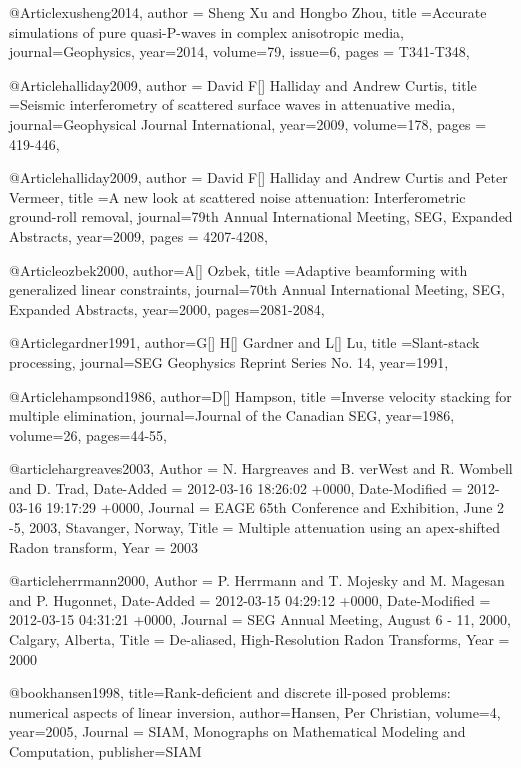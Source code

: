 @Article{xusheng2014,
  author = {Sheng Xu and Hongbo Zhou},
  title ={Accurate simulations of pure quasi-P-waves in complex anisotropic media},
  journal={Geophysics},
  year=2014,
  volume={79},
  issue=6,
  pages = {T341-T348},
}

@Article{halliday2009,
  author = {David F[] Halliday and Andrew Curtis},
  title ={Seismic interferometry of scattered surface waves in attenuative media},
  journal={Geophysical Journal International},
  year=2009,
  volume={178},
  pages = {419-446},
}





@Article{halliday2009,
  author = {David F[] Halliday and Andrew Curtis and Peter Vermeer},
  title ={A new look at scattered noise attenuation: Interferometric ground-roll removal},
  journal={79th Annual International Meeting, SEG, Expanded Abstracts},
  year=2009,
  pages = {4207-4208},
}

@Article{ozbek2000,
  author={A[] Ozbek},
  title ={Adaptive beamforming with generalized linear constraints},
  journal={70th Annual International Meeting, SEG, Expanded Abstracts},
  year=2000,
  pages={2081-2084},
}



@Article{gardner1991,
  author={G[] H[] Gardner and L[] Lu},
  title ={Slant-stack processing},
  journal={SEG Geophysics Reprint Series No. 14},
  year=1991,
}

@Article{hampsond1986,
  author={D[] Hampson},
  title ={Inverse velocity stacking for multiple elimination},
  journal={Journal of the Canadian SEG},
  year=1986,
  volume=26,
  pages={44-55},
}

@article{hargreaves2003,
	Author = {N. Hargreaves and B. verWest and R. Wombell and D. Trad},
	Date-Added = {2012-03-16 18:26:02 +0000},
	Date-Modified = {2012-03-16 19:17:29 +0000},
	Journal = {EAGE 65th Conference and Exhibition, June 2 -5, 2003, Stavanger, Norway},
	Title = {Multiple attenuation using an apex-shifted {R}adon transform},
	Year = {2003}}

@article{herrmann2000,
	Author = {P. Herrmann and T. Mojesky and M. Magesan and P. Hugonnet},
	Date-Added = {2012-03-15 04:29:12 +0000},
	Date-Modified = {2012-03-15 04:31:21 +0000},
	Journal = {SEG Annual Meeting, August 6 - 11, 2000, Calgary, Alberta},
	Title = {De-aliased, High-Resolution {R}adon Transforms},
	Year = {2000}}

@book{hansen1998,
  title={Rank-deficient and discrete ill-posed problems: numerical aspects of linear inversion},
  author={Hansen, Per Christian},
  volume={4},
  year={2005},
  Journal = {SIAM, Monographs on Mathematical Modeling and Computation},
  publisher={SIAM}
}


